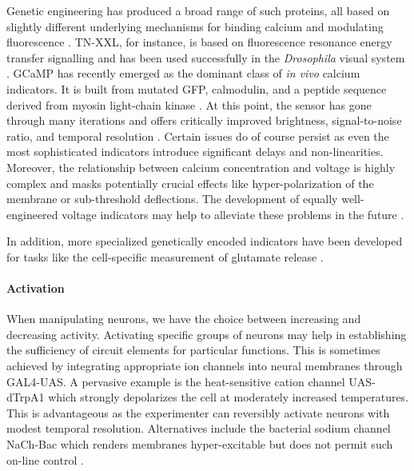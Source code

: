 Genetic engineering has produced a broad range of such proteins, all based on slightly different underlying mechanisms for binding calcium and modulating fluorescence \citep{Knopfel:2012aa}. TN-XXL, for instance, is based on fluorescence resonance energy transfer signalling and has been used successfully in the \textit{Drosophila} visual system \citep{Mank:2008kg,Reiff:2010eo}. GCaMP has recently emerged as the dominant class of \textit{in vivo} calcium indicators. It is built from mutated GFP, calmodulin, and a peptide sequence derived from myosin light-chain kinase \citep{Nakai:2001aa}. At this point, the sensor has gone through many iterations and offers critically improved brightness, signal-to-noise ratio, and temporal resolution \citep{Chen:2013fc}. Certain issues do of course persist as even the most sophisticated indicators introduce significant delays and non-linearities. Moreover, the relationship between calcium concentration and voltage is highly complex and masks potentially crucial effects like hyper-polarization of the membrane or sub-threshold deflections. The development of equally well-engineered voltage indicators may help to alleviate these problems in the future \citep{Looger:2012aa}.

In addition, more specialized genetically encoded indicators have been developed for tasks like the cell-specific measurement of glutamate release \citep{Marvin:2013aa}.

\paragraph{Activation} When manipulating neurons, we have the choice between increasing and decreasing activity. Activating specific groups of neurons may help in establishing the sufficiency of circuit elements for particular functions. This is sometimes achieved by integrating appropriate ion channels into neural membranes through GAL4-UAS. A pervasive example is the heat-sensitive cation channel UAS-dTrpA1 \citep{Rosenzweig:2005aa,Parisky:2008aa} which strongly depolarizes the cell at moderately increased temperatures. This is advantageous as the experimenter can reversibly activate neurons with modest temporal resolution. Alternatives include the bacterial sodium channel NaCh-Bac which renders membranes hyper-excitable but does not permit such on-line control \citep{Nitabach:2006aa}.

